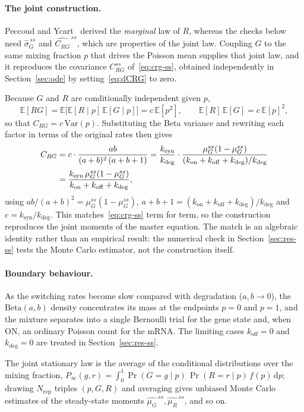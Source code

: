 \documentclass[11pt]{article}
\newcommand{\muG}{\mu_G}
\newcommand{\muR}{\mu_R}
\newcommand{\CRG}{C_{RG}}
\newcommand{\kon}{k_{\mathrm{on}}}
\newcommand{\koff}{k_{\mathrm{off}}}
\newcommand{\ksyn}{k_{\mathrm{syn}}}
\newcommand{\kdeg}{k_{\mathrm{deg}}}
\newcommand{\E}{\mathbb{E}}
\begin{document}
\paragraph{The joint construction.}
Peccoud and Ycart~\cite{peccoud1995} derived the \emph{marginal} law of $R$, whereas the checks below need
$\widehat{\sigma}_G^{\,ss}$ and $\widehat{\CRG}^{\,ss}$, which are properties of the joint law. Coupling
$G$ to the same mixing fraction $p$ that drives the Poisson mean supplies that joint law, and it
reproduces the covariance $\CRG^{ss}$ of~\eqref{eq:crg-ss}, obtained independently in
Section~\ref{sec:ode} by setting~\eqref{eq:dCRG} to zero.

Because $G$ and $R$ are conditionally
independent given $p$,
\begin{equation}
\label{eq:erg}
  \E[RG] = \E\big[\E[R\mid p]\,\E[G\mid p]\big] = c\,\E[p^2],
  \qquad \E[R]\,\E[G] = c\,\E[p]^2 ,
\end{equation}
so that $\CRG = c\,\mathrm{Var}(p)$. Substituting the Beta variance and rewriting each factor in
terms of the original rates then gives
\begin{align}
\label{eq:crg-smp}
  \CRG
  &= c\cdot\frac{ab}{(a+b)^2\,(a+b+1)}
   = \frac{\ksyn}{\kdeg}\cdot\frac{\muG^{ss}(1-\muG^{ss})}{(\kon+\koff+\kdeg)/\kdeg} \notag \\[2pt]
  &= \frac{\ksyn\,\muG^{ss}(1-\muG^{ss})}{\kon+\koff+\kdeg} ,
\end{align}
using $ab/(a+b)^2=\muG^{ss}(1-\muG^{ss})$, $a+b+1=(\kon+\koff+\kdeg)/\kdeg$ and $c=\ksyn/\kdeg$.
This matches~\eqref{eq:crg-ss} term for term, so the construction reproduces the joint moments of the
master equation. The match is an algebraic identity rather than an empirical result: the numerical
check in Section~\ref{sec:res-ss} tests the Monte Carlo estimator, not the construction itself.

\paragraph{Boundary behaviour.}
As the switching rates become slow compared with degradation ($a,b\to 0$), the $\mathrm{Beta}(a,b)$
density concentrates its mass at the endpoints $p=0$ and $p=1$, and the mixture separates into a single
Bernoulli trial for the gene state and, when ON, an ordinary Poisson count for the mRNA. The limiting
cases $\koff=0$ and $\kdeg=0$ are treated in Section~\ref{sec:res-ss}.

The joint stationary law is the average of the conditional distributions over the mixing fraction,
$P_\infty(g,r) = \int_0^1 \Pr(G=g\mid p)\,\Pr(R=r\mid p)\,f(p)\,\mathrm{d}p$; drawing
$N_{\mathrm{rep}}$ triples $(p,G,R)$ and averaging gives unbiased Monte Carlo estimates of the
steady-state moments $\widehat{\muG}^{\,ss},\widehat{\muR}^{\,ss}$, and so on.
\end{document}
